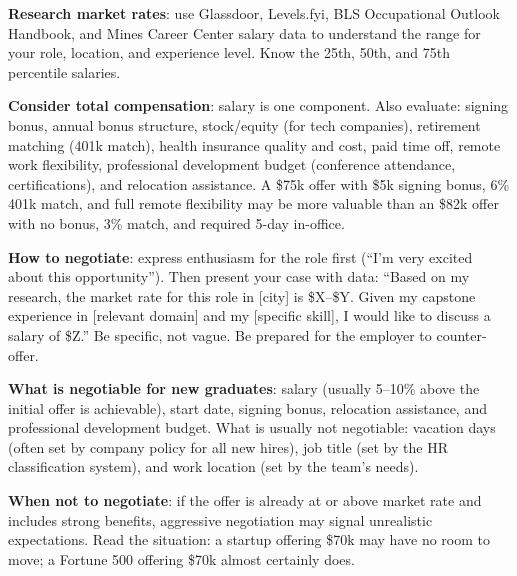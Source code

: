 \textbf{Research market rates}: use Glassdoor, Levels.fyi, BLS Occupational Outlook Handbook, and Mines Career Center salary data to understand the range for your role, location, and experience level. Know the 25th, 50th, and 75th percentile salaries.

\textbf{Consider total compensation}: salary is one component. Also evaluate: signing bonus, annual bonus structure, stock/equity (for tech companies), retirement matching (401k match), health insurance quality and cost, paid time off, remote work flexibility, professional development budget (conference attendance, certifications), and relocation assistance. A \$75k offer with \$5k signing bonus, 6\% 401k match, and full remote flexibility may be more valuable than an \$82k offer with no bonus, 3\% match, and required 5-day in-office.

\textbf{How to negotiate}: express enthusiasm for the role first (``I'm very excited about this opportunity''). Then present your case with data: ``Based on my research, the market rate for this role in [city] is \$X--\$Y. Given my capstone experience in [relevant domain] and my [specific skill], I would like to discuss a salary of \$Z.'' Be specific, not vague. Be prepared for the employer to counter-offer.

\textbf{What is negotiable for new graduates}: salary (usually 5--10\% above the initial offer is achievable), start date, signing bonus, relocation assistance, and professional development budget. What is usually not negotiable: vacation days (often set by company policy for all new hires), job title (set by the HR classification system), and work location (set by the team's needs).

\textbf{When not to negotiate}: if the offer is already at or above market rate and includes strong benefits, aggressive negotiation may signal unrealistic expectations. Read the situation: a startup offering \$70k may have no room to move; a Fortune 500 offering \$70k almost certainly does.



